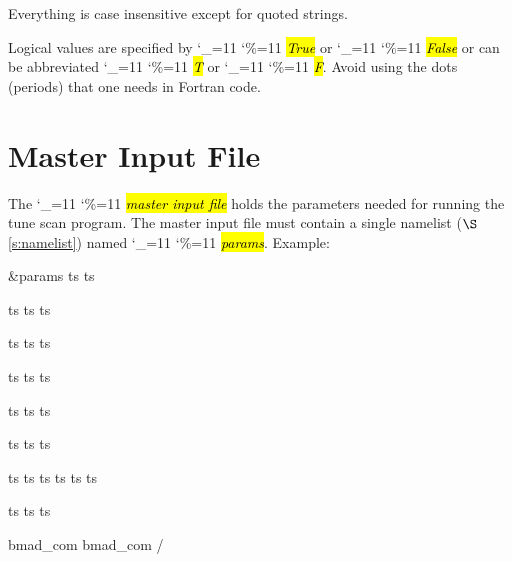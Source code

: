 \documentclass{hitec}
\newcommand\dottcmd[1]{\hl{\em#1}\endgroup}
\newcommand{\vn}{\begingroup\catcode`\_=11 \catcode`\%=11 \dottcmd}
\newcommand{\sref}[1]{$\S$\ref{#1}}
\newcommand{\Section}[1]{\section{#1}\vspace*{-1ex}}
\begin{document}
Everything is case insensitive except for quoted strings.

Logical values are specified by \vn{True} or \vn{False} or can be abbreviated \vn{T} or
\vn{F}. Avoid using the dots (periods) that one needs in Fortran code.

\Section{Master Input File}
\label{s:input}

The \vn{master input file} holds the parameters needed for running the tune scan program. The master
input file must contain a single namelist (\sref{s:namelist}) named \vn{params}.  Example:
\begin{code}
&params
  ts%
  ts%

  ts%
  ts%
  ts%

  ts%
  ts%
  ts%

  ts%
  ts%
  ts%

  ts%
  ts%
  ts%

  ts%
  ts%
  ts%

  ts%
  ts%
  ts%
  ts%
  ts%
  ts%

  ts%
  ts%
  ts%

  bmad_com%
  bmad_com%
/
\end{code}
\end{document}

